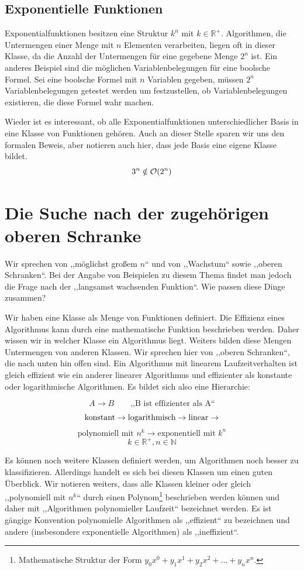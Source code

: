 \subsection{Exponentielle Funktionen}
%
Exponentialfunktionen besitzen eine Struktur $k^n$ mit $k \in \mathbb{R}^+$. Algorithmen, die Untermengen einer Menge mit $n$ Elementen verarbeiten, liegen oft in dieser Klasse, da die Anzahl der Untermengen für eine gegebene Menge $2^n$ ist. Ein anderes Beispiel sind die möglichen Variablenbelegungen für eine boolsche Formel. Sei eine boolsche Formel mit $n$ Variablen gegeben, müssen $2^n$ Variablenbelegungen getestet werden um festzustellen, ob Variablenbelegungen existieren, die diese Formel wahr machen.

Wieder ist es interessant, ob alle Exponentialfunktionen unterschiedlicher Basis in eine Klasse von Funktionen gehören. Auch an dieser Stelle sparen wir uns den formalen Beweis, aber notieren auch hier, dass jede Basis eine eigene Klasse bildet.
\[
  3^n \notin \mathcal{O}\!\left(2^n\right)
\]
%
\section{Die Suche nach der zugehörigen oberen Schranke}
%
Wir sprechen von ,,möglichst großem $n$`` und von ,,Wachstum`` sowie ,,oberen Schranken``. Bei der Angabe von Beispielen zu diesem Thema findet man jedoch die Frage nach der ,,langsamst wachsenden Funktion``. Wie passen diese Dinge zusammen?

Wir haben eine Klasse als Menge von Funktionen definiert. Die Effizienz eines Algorithmus kann durch eine mathematische Funktion beschrieben werden. Daher wissen wir in welcher Klasse ein Algorithmus liegt. Weiters bilden diese Mengen Untermengen von anderen Klassen. Wir sprechen hier von ,,oberen Schranken``, die nach unten hin offen sind. Ein Algorithmus mit linearem Laufzeitverhalten ist gleich effizient wie ein anderer linearer Algorithmus und effizienter als konstante oder logarithmische Algorithmen. Es bildet sich also eine Hierarchie:

\[
  A \rightarrow B \qquad \text{,,B ist effizienter als A``}
\] \[
  \text{konstant} \rightarrow
  \text{logarithmisch} \rightarrow
  \text{linear} \rightarrow
  \vspace{-8pt}
\] \[
  \text{polynomiell mit $n^k$} \rightarrow
  \text{exponentiell mit $k^n$}
\] \[
  k \in \mathbb{R}^+, n \in \mathbb{N}
\]

Es können noch weitere Klassen definiert werden, um Algorithmen noch besser zu klassifizieren. Allerdings handelt es sich bei diesen Klassen um einen guten Überblick. Wir notieren weiters, dass alle Klassen kleiner oder gleich ,,polynomiell mit $n^k$`` durch einen Polynom\footnote{Mathematische Struktur der Form $y_0x^0 + y_1x^1 + y_2x^2 + \ldots + y_nx^n$.} beschrieben werden können und daher mit ,,Algorithmen polynomieller Laufzeit`` bezeichnet werden. Es ist gängige Konvention polynomielle Algorithmen als ,,effizient`` zu bezeichnen und andere (insbesondere exponentielle Algorithmen) als ,,ineffizient``.

